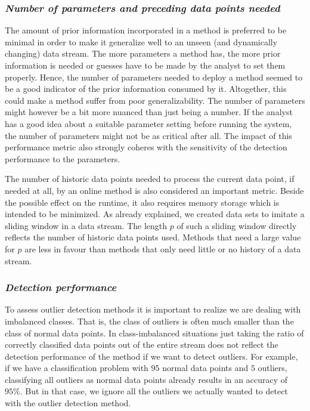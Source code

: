 \subsubsection{\textit{Number of parameters and preceding data points needed}}
The amount of prior information incorporated in a method is preferred to be minimal in order to make it generalize well to an unseen (and dynamically changing) data stream. The more parameters a method has, the more prior information is needed or guesses have to be made by the analyst to set them properly. Hence, the number of parameters needed to deploy a method seemed to be a good indicator of the prior information consumed by it. 
Altogether, this could make a method suffer from poor generalizability. The number of parameters might however be a bit more nuanced than just being a number. If the analyst has a good idea about a suitable parameter setting before running the system, the number of parameters might not be as critical after all. The impact of this performance metric also strongly coheres with the sensitivity of the detection performance to the parameters.

The number of historic data points needed to process the current data point, if needed at all, by an online method is also considered an important metric. Beside the possible effect on the runtime, it also requires memory storage which is intended to be minimized. As already explained, we created data sets to imitate a sliding window in a data stream. The length $p$ of such a sliding window directly reflects the number of historic data points used. Methods that need a large value for $p$ are less in favour than methods that only need little or no history of a data stream.

\subsubsection{\textit{Detection performance}}

To assess outlier detection methods it is important to realize we are dealing with imbalanced classes. That is, the class of outliers is often much smaller than the class of normal data points. In class-imbalanced situations just taking the ratio of correctly classified data points out of the entire stream does not reflect the detection performance of the method if we want to detect outliers. For example, if we have a classification problem with $95$ normal data points and $5$ outliers, classifying all outliers as normal data points already results in an accuracy of $95\%$. But in that case, we ignore all the outliers we actually wanted to detect with the outlier detection method. 

